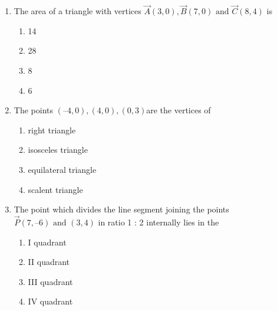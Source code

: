\begin{enumerate}[label=\thesection.\arabic*,ref=\thesection.\theenumi]
\begin{enumerate}
\item5
\item 12
\item 11
\item 7
\end{enumerate}
\item The area of a triangle with vertices $\vec{A}(3, 0), \vec{B}(7, 0) \text{ and } \vec{C}(8, 4)$ is
\begin{enumerate}

\item 14
\item 28
\item 8
\item 6
\end{enumerate}
\item The points $ (–4, 0), (4, 0), (0, 3) $are the vertices of
	\begin{enumerate}
\item right triangle 
\item isosceles triangle
\item  equilateral triangle
\item  scalent triangle 
\end{enumerate}
\item The point which divides the line segment joining the points $\vec{P} (7, –6) \text{ and } (3, 4)$ in
ratio 1 : 2 internally lies in the
\begin{enumerate}

\item I quadrant

\item  II quadrant

\item  III quadrant

\item  IV quadrant
\end{enumerate}


\end{enumerate}
